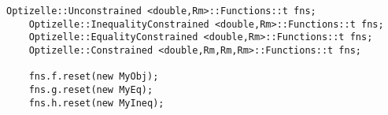 \begin{lstlisting}[style=C++]
    Optizelle::Unconstrained <double,Rm>::Functions::t fns;
    Optizelle::InequalityConstrained <double,Rm>::Functions::t fns;
    Optizelle::EqualityConstrained <double,Rm>::Functions::t fns;
    Optizelle::Constrained <double,Rm,Rm,Rm>::Functions::t fns;

    fns.f.reset(new MyObj);
    fns.g.reset(new MyEq);
    fns.h.reset(new MyIneq);
\end{lstlisting}
